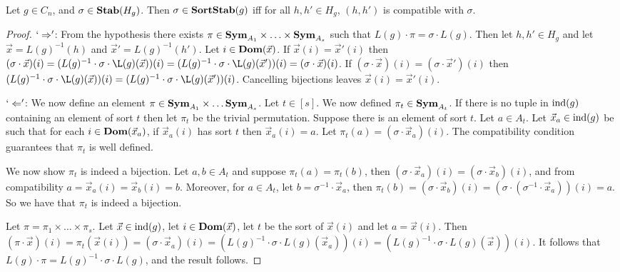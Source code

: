 \documentclass[../paper.tex]{subfiles}
\begin{document}
\begin{lem}
  Let $g \in C_n$, and $\sigma \in \text{\textbf{Stab}}(H_g)$. Then $\sigma \in \text{\textbf{SortStab}}(g)$
  iff for all $h, h' \in H_g$, $(h,h')$ is compatible with $\sigma$.
\end{lem}
\begin{proof}
  $`\Rightarrow'$: From the hypothesis there exists $\pi \in \text{\textbf{Sym}}_{A_1} \times
  \ldots \times \text{\textbf{Sym}}_{A_s}$ such that $L(g) \cdot \pi = \sigma \cdot L(g)$. Then
  let $h, h' \in H_g$ and let $\vec{x} = L(g)^{-1}(h)$ and $\vec{x}' =
  L(g)^{-1}(h')$. Let $i \in \text{\textbf{Dom}} (\vec{x})$. If $\vec{x}(i) = \vec{x}'(i)$ then
  $(\sigma \cdot \vec{x}) (i) = (L(g)^{-1} \cdot \sigma \cdot \L(g)
  (\vec{x}))(i) = (L(g)^{-1} \cdot \sigma \cdot \L(g) (\vec{x}'))(i) = (\sigma
  \cdot \vec{x}) (i)$. If $(\sigma \cdot \vec{x})(i) = (\sigma \cdot
  \vec{x}')(i)$ then $(L(g)^{-1} \cdot \sigma \cdot \L(g) (\vec{x}))(i) =
  (L(g)^{-1} \cdot \sigma \cdot \L(g) (\vec{x}'))(i)$. Cancelling bijections
  leaves $\vec{x}(i) = \vec{x}'(i)$.
  
  $`\Leftarrow'$: We now define an element $\pi \in \text{\textbf{Sym}}_{A_1} \times \ldots
  \text{\textbf{Sym}}_{A_s}$. Let $t \in [s]$. We now defined $\pi_t \in \text{\textbf{Sym}}_{A_t}$. If there
  is no tuple in $\text{\upshape ind} (g)$ containing an element of sort $t$ then let $\pi_t$
  be the trivial permutation. Suppose there is an element of sort $t$. Let $a
  \in A_t$. Let $\vec{x}_a \in \text{\upshape ind}(g)$ be such that for each $i \in \text{\textbf{Dom}}
  (\vec{x}_a)$, if $\vec{x}_a(i)$ has sort $t$ then $\vec{x}_a(i) = a$. Let
  $\pi_t (a) = (\sigma \cdot \vec{x}_a) (i)$. The compatibility condition
  guarantees that $\pi_t$ is well defined.

  We now show $\pi_t$ is indeed a bijection. Let $a, b \in A_t$ and suppose
  $\pi_t (a) = \pi_t(b)$, then $(\sigma \cdot \vec{x}_a)(i) = (\sigma \cdot
  \vec{x}_b)(i)$, and from compatibility $a = \vec{x}_a(i) = \vec{x}_b(i) = b$.
  Moreover, for $a \in A_t$, let $b = \sigma^{-1} \cdot \vec{x}_a$, then $\pi_t
  (b) = (\sigma \cdot \vec{x}_b)(i) = (\sigma \cdot (\sigma^{-1} \cdot
  \vec{x}_a))(i) = a$. So we have that $\pi_t$ is indeed a bijection.

  Let $\pi = \pi_1 \times \ldots \times \pi_s$. Let $\vec{x} \in \text{\upshape ind}(g)$, let
  $i \in \text{\textbf{Dom}} (\vec{x})$, let $t$ be the sort of $\vec{x}(i)$ and let $a =
  \vec{x}(i)$. Then $(\pi \cdot \vec{x})(i) = \pi_t (\vec{x}(i)) = (\sigma \cdot
  \vec{x}_a)(i) = (L(g)^{-1}\cdot \sigma \cdot L(g)(\vec{x}_a))(i) =
  (L(g)^{-1}\cdot \sigma \cdot L(g)(\vec{x}))(i)$. It follows that $L(g) \cdot
  \pi = L(g)^{-1} \cdot \sigma \cdot L(g)$, and the result follows.


\end{proof}
\end{document}
